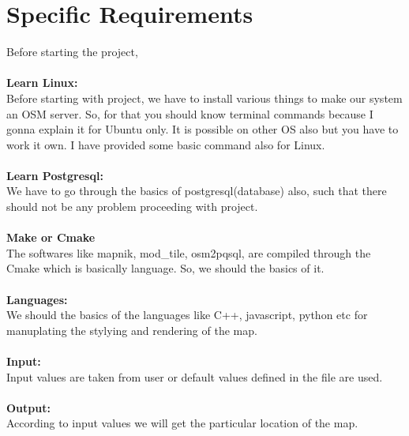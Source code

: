 \section{Specific Requirements}
Before starting the project, \\\\
\textbf{Learn Linux:}\\
Before starting with project, we have to install various things to make our system an OSM server. So, for that you should know terminal commands because I gonna explain it for Ubuntu only. It is possible on other OS also but you have to work it own. I have provided some basic command also for Linux. \\\\
\textbf{Learn Postgresql:}\\
 We have to go through the basics of postgresql(database) also, such that there
should not be any problem proceeding with project.\\\\
\textbf{Make or Cmake}\\
The softwares like mapnik, mod\_tile, osm2pqsql, are compiled through the Cmake which is basically language. So, we should the basics of it.
\\\\
\textbf{Languages:}\\
We should the basics of the languages like C++, javascript, python etc for manuplating the stylying and rendering of the map.\\\\
\textbf{Input:}\\
Input values are taken from user or default values defined in the file are used.\\\\
\textbf{Output:}\\
According to input values we will get the particular location of the map.

